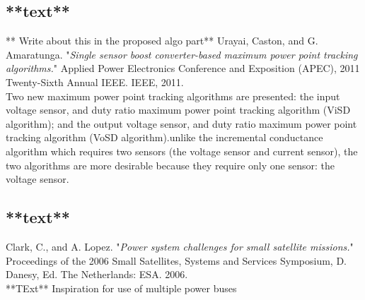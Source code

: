 \subsection{**text**\cite{urayai2011single}}
** Write about this in the proposed algo part**  
Urayai, Caston, and G. Amaratunga. "\textit{Single sensor boost converter-based maximum power point tracking algorithms.}" Applied Power Electronics Conference and Exposition (APEC), 2011 Twenty-Sixth Annual IEEE. IEEE, 2011.\\

Two new maximum power point tracking algorithms are presented: the input voltage sensor, and duty ratio maximum power point tracking algorithm (ViSD algorithm); and the output voltage sensor, and duty ratio maximum power point tracking algorithm (VoSD algorithm).unlike the incremental conductance algorithm which requires two sensors (the voltage sensor and current sensor), the two algorithms are more desirable because they require only one sensor: the voltage sensor.  \\ 

\subsection{**text**\cite{clark2006power}}

Clark, C., and A. Lopez. "\textit{Power system challenges for small satellite missions.}" Proceedings of the 2006 Small Satellites, Systems and Services Symposium, D. Danesy, Ed. The Netherlands: ESA. 2006.\\


**TExt**
Inspiration for use of multiple power buses 



